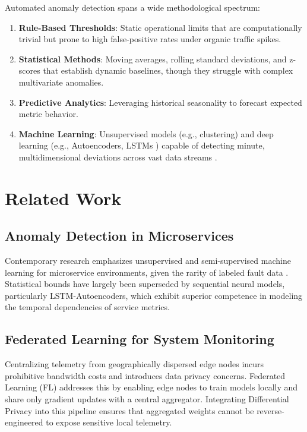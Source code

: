 Automated anomaly detection spans a wide methodological spectrum:

\begin{enumerate}
    \item \textbf{Rule-Based Thresholds}: Static operational limits that are
    computationally trivial but prone to high false-positive rates under organic
    traffic spikes.

    \item \textbf{Statistical Methods}: Moving averages, rolling standard deviations,
    and z-scores that establish dynamic baselines, though they struggle with complex
    multivariate anomalies.

    \item \textbf{Predictive Analytics}: Leveraging historical seasonality to forecast
    expected metric behavior.

    \item \textbf{Machine Learning}: Unsupervised models (e.g., clustering) and deep
    learning (e.g., Autoencoders, LSTMs \cite{malhotra2015lstm}) capable of detecting
    minute, multidimensional deviations across vast data streams \cite{lokiny2026monitoring}.
\end{enumerate}

\section{Related Work}
\label{sec:bg_related_work}

\subsection{Anomaly Detection in Microservices}
\label{subsec:rw_anomaly}

Contemporary research emphasizes unsupervised and semi-supervised machine learning for
microservice environments, given the rarity of labeled fault data \cite{lin2018aiops}.
Statistical bounds have largely been superseded by sequential neural models,
particularly LSTM-Autoencoders, which exhibit superior competence in modeling the
temporal dependencies of service metrics.

\subsection{Federated Learning for System Monitoring}
\label{subsec:rw_federated}

Centralizing telemetry from geographically dispersed edge nodes incurs prohibitive
bandwidth costs and introduces data privacy concerns. Federated Learning (FL)
\cite{mcmahan2017communication} addresses this by enabling edge nodes to train models
locally and share only gradient updates with a central aggregator. Integrating
Differential Privacy \cite{dwork2006differential} into this pipeline \cite{abadi2016deep}
ensures that aggregated weights cannot be reverse-engineered to expose sensitive local
telemetry.

